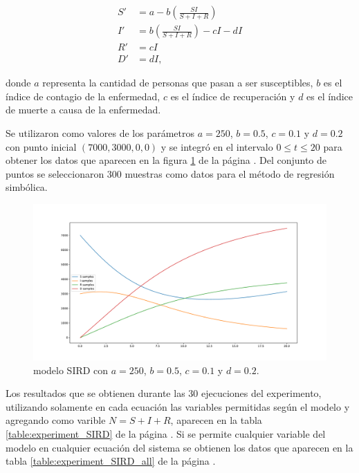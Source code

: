 \begin{align*}
    S' & = a - b (\frac{S I}{S + I + R})         \\
    I' & = b (\frac{S I}{S + I + R}) - c I - d I \\
    R' & = c I                                   \\
    D' & = d I,
\end{align*}

donde $a$ representa la cantidad de personas que pasan a ser susceptibles, $b$ es el índice de contagio de la enfermedad, $c$ es el índice de recuperación y $d$ es el índice de muerte a causa de la enfermedad.

Se utilizaron como valores de los parámetros $a = 250$, $b = 0.5$, $c = 0.1$ y $d = 0.2$ con punto inicial $(7000, 3000, 0, 0)$ y se integró en el intervalo $0 \leq t \leq 20$ para obtener los datos que aparecen en la figura \ref{fig:SIRD} de la página \pageref{fig:SIRD}. Del conjunto de puntos se seleccionaron 300 muestras como datos para el método de regresión simbólica.

\begin{figure}[h]
    \centering
    \includegraphics[width=\textwidth]{"figures/SIRD.pdf"}
    \caption{modelo SIRD con $a = 250$, $b = 0.5$, $c = 0.1$ y $d = 0.2$.}
    \label{fig:SIRD}
\end{figure}

Los resultados que se obtienen durante las 30 ejecuciones del experimento, utilizando solamente en cada ecuación las variables permitidas según el modelo y agregando como varible $N=S + I + R$, aparecen en la tabla \ref{table:experiment_SIRD} de la página \pageref{table:experiment_SIRD}. Si se permite cualquier variable del modelo en cualquier ecuación del sistema se obtienen los datos que aparecen en la tabla \ref{table:experiment_SIRD_all} de la página \pageref{table:experiment_SIRD_all}.

